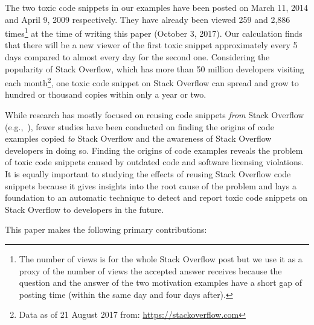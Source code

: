 \documentclass[10pt,journal,compsoc]{IEEEtran}
\begin{document}
The two toxic code snippets in our examples have been posted on March 11, 2014 and
April 9, 2009 respectively. They have already been viewed 259 and 2,886 times\footnote{The number of views
is for the whole Stack Overflow post but we use it as a proxy of the number of views the accepted answer receives
because the question and the answer of the two motivation examples have a short gap of posting time (within the same day and four days after).} 
at
the time of writing this paper (October 3, 2017). Our calculation finds that
there will be a new viewer of the first toxic snippet approximately every 5
days compared to almost every day for the second one. 
Considering the popularity of Stack Overflow, which has more than 50 million developers visiting
each month\footnote{Data as of 21 August 2017 from:
	\url{https://stackoverflow.com}}, one toxic code snippet on Stack Overflow can
spread and grow to hundred or thousand copies within only a year or two.


While research has mostly focused on reusing code snippets \emph{from} Stack
Overflow (e.g.,~\cite{Keivanloo2014,An2017,Yang2016}), fewer studies have been
conducted on finding the origins of code examples copied \emph{to} Stack
Overflow and the awareness of Stack Overflow developers in doing so. Finding the
origins of code examples reveals the problem of toxic code snippets
caused by outdated code and software licensing violations. It is equally
important to studying the effects of reusing Stack Overflow code snippets
because it gives insights into the root cause of the problem and lays a
foundation to an automatic technique to detect and report
toxic code snippets on Stack Overflow to developers in the future.

This paper makes the following primary contributions:
\end{document}
